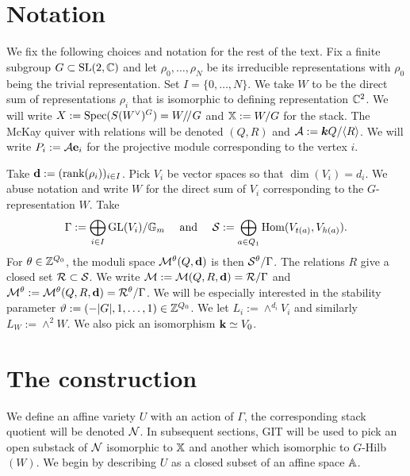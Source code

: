 \documentclass{amsart}
\theoremstyle{definition}
\begin{document}
\section*{Notation}
We fix the following choices and notation for the rest of the text.
Fix a finite subgroup $G \subset \operatorname{SL}(2,\mathbb{C})$ and let $\rho_0, \ldots, \rho_N$ be its
irreducible representations with $\rho_0$ being the trivial representation.
Set $I=\{0,\ldots,N\}$.
We take $W$ to be the direct sum of representations $\rho_i$ that is isomorphic to defining representation $\mathbb{C}^2$.
We will write $X:=\operatorname{Spec}(S(W^\vee)^G) = W / \! /_{} G$ and $\mathbb{X}:=W/G$ for the stack.
The McKay quiver with relations will be denoted $(Q,R)$ and $\mathcal{A}:= {\boldsymbol{k}} Q/ \langle R\rangle$.
We will write $P_i:= \mathcal{A}\mathbf{e}_i$ for the projective module corresponding to the vertex $i$.

Take $\mathbf{d}:=(\text{rank}(\rho_i))_{i \in I}$. 
Pick $V_i$ be vector spaces so that $\dim(V_i)=d_i$.
We abuse notation and write $W$ for the direct sum of $V_i$ corresponding to the $G$-representation $W$.
Take $$\Gamma:= \bigoplus_{i \in I} \text{GL}(V_i) / \mathbb{G}_m \quad \text{ and }\quad\mathcal{S}:=\bigoplus_{a \in Q_1} \operatorname{Hom}(V_{t(a)}, V_{h(a)}).$$
For $\theta \in \mathbb{Z}^{Q_0}$, the moduli space $\mathcal{M}^\theta(Q,\mathbf{d})$ is then $\mathcal{S}^\theta / \Gamma$.
The relations $R$ give a closed set $\mathcal{R} \subset \mathcal{S}$.
We write $\mathcal{M}:= \mathcal{M}(Q,R,\mathbf{d})=\mathcal{R}/\Gamma$ and $\mathcal{M}^\theta:=\mathcal{M}^\theta(Q,R,\mathbf{d})=\mathcal{R}^\theta/\Gamma$.
We will be especially interested in the stability parameter $\vartheta:= (-|G|,1, \ldots, 1) \in \mathbb{Z}^{Q_0}$.
We let $L_i:= \wedge^{d_i} V_i$ and similarly $L_W:= \wedge^2 W$.
We also pick an isomorphism $\mathbf{k} \simeq V_0$.


\section{The construction}

We define an affine variety $U$ with an action of $\Gamma$, the corresponding stack quotient will be denoted $\mathcal{N}$.
In subsequent sections, GIT will be used to pick an open substack of $\mathcal{N}$ isomorphic to $\mathbb{X}$ and another which isomorphic to $G$-Hilb$(W)$.
We begin by describing $U$ as a closed subset of an affine space $\mathbb{A}$.
\end{document}
